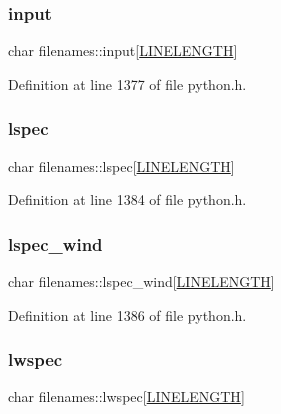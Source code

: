\subsubsection{\texorpdfstring{input}{input}}
{\footnotesize\ttfamily char filenames\+::input\mbox{[}\hyperlink{xlog_8c_a10e8c7b8458375c3dbfbb4010a2aba8c}{L\+I\+N\+E\+L\+E\+N\+G\+TH}\mbox{]}}



Definition at line 1377 of file python.\+h.

\mbox{\label{structfilenames_abe876554c7cdd821a6365745cc23079b}} 
\subsubsection{\texorpdfstring{lspec}{lspec}}
{\footnotesize\ttfamily char filenames\+::lspec\mbox{[}\hyperlink{xlog_8c_a10e8c7b8458375c3dbfbb4010a2aba8c}{L\+I\+N\+E\+L\+E\+N\+G\+TH}\mbox{]}}



Definition at line 1384 of file python.\+h.

\mbox{\label{structfilenames_ae7434018e963fbee3799a61f17025e01}} 
\subsubsection{\texorpdfstring{lspec\+\_\+wind}{lspec\_wind}}
{\footnotesize\ttfamily char filenames\+::lspec\+\_\+wind\mbox{[}\hyperlink{xlog_8c_a10e8c7b8458375c3dbfbb4010a2aba8c}{L\+I\+N\+E\+L\+E\+N\+G\+TH}\mbox{]}}



Definition at line 1386 of file python.\+h.

\mbox{\label{structfilenames_a79368c322d08dbd2e3fa460d364ed3a0}} 
\subsubsection{\texorpdfstring{lwspec}{lwspec}}
{\footnotesize\ttfamily char filenames\+::lwspec\mbox{[}\hyperlink{xlog_8c_a10e8c7b8458375c3dbfbb4010a2aba8c}{L\+I\+N\+E\+L\+E\+N\+G\+TH}\mbox{]}}



